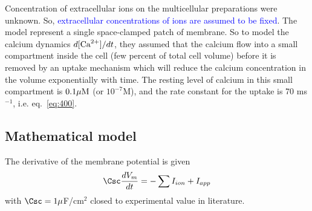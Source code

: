 Concentration of extracellular ions on the multicellular preparations were
unknown. So, \textcolor{blue}{extracellular concentrations of ions are assumed
to  be fixed}.
The model represent a single space-clamped patch of membrane. So to model the
calcium dynamics $d[{\text{Ca}^{2+}}]/dt$, they assumed that the calcium flow into a small
compartment inside the cell (few percent of total cell volume) before it is
removed by an uptake mechanism which will reduce the calcium concentration in
the volume exponentially with time. The resting level of calcium in this small
compartment is $0.1{\mu\text{M}}$ (or $10^{-7}$M), and the rate constant for the uptake
is 70 ms$^{-1}$, i.e. eq.~\eqref{eq:400}.


\subsection{Mathematical model}
\label{sec:mathematical-model-7}

The derivative of the membrane potential is given
\begin{equation}
  \label{eq:575}
  \Csc\frac{dV_m}{dt} = -\sum I_{ion} + I_{app}
\end{equation}
with $\Csc=1\mu$F/cm$^2$ closed to experimental value in literature.

